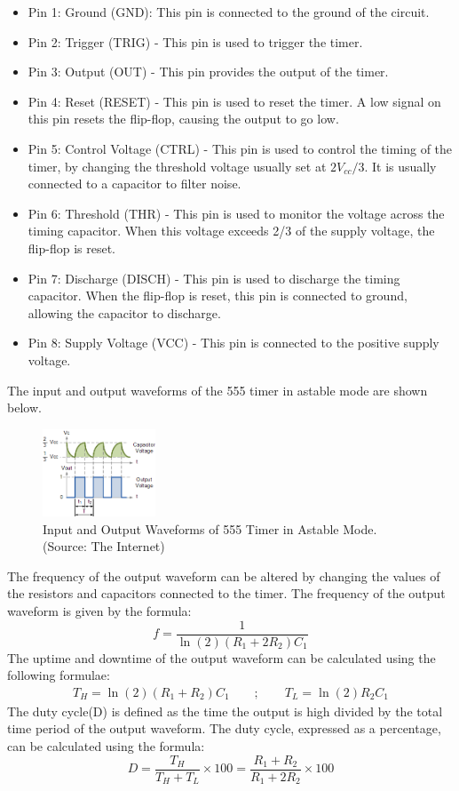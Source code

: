 \documentclass{scrartcl}
\newcommand{\1}{\mathbbm{1}}
\begin{document}
\begin{itemize}
    \item Pin 1: Ground (GND): This pin is connected to the ground of the circuit.
    \item Pin 2: Trigger (TRIG) - This pin is used to trigger the timer.
    \item Pin 3: Output (OUT) - This pin provides the output of the timer. 
    \item Pin 4: Reset (RESET) - This pin is used to reset the timer. A low signal on this pin resets the flip-flop, causing the output to go low.
    \item Pin 5: Control Voltage (CTRL) - This pin is used to control the timing of the timer, by changing the threshold voltage usually set at $2V_{cc}/3$. It is usually connected to a capacitor to filter noise.
    \item Pin 6: Threshold (THR) - This pin is used to monitor the voltage across the timing capacitor. When this voltage exceeds 2/3 of the supply voltage, the flip-flop is reset.
    \item Pin 7: Discharge (DISCH) - This pin is used to discharge the timing capacitor. When the flip-flop is reset, this pin is connected to ground, allowing the capacitor to discharge.
    \item Pin 8: Supply Voltage (VCC) - This pin is connected to the positive supply voltage.
\end{itemize} 

The input and output waveforms of the 555 timer in astable mode are shown below. 
\begin{figure}[H]
    \centering
    \includegraphics[width=0.3\textwidth]{waveforms.png}
    \caption{Input and Output Waveforms of 555 Timer in Astable Mode.  (Source: The Internet)}
    \label{fig:waveform}
\end{figure}

The frequency of the output waveform can be altered by changing the values of the resistors and capacitors connected to the timer.
The frequency of the output waveform is given by the formula:
\begin{equation}
    f = \frac{1}{\ln(2)(R_1 + 2R_2)C_1}
\end{equation}
The uptime and downtime of the output waveform can be calculated using the following formulae:
\begin{align}
    T_{H} = \ln(2)(R_1 + R_2)C_1\quad\quad;\quad\quad
    T_{L} = \ln(2)R_2C_1
\end{align}
The duty cycle(D) is defined as the time the output is high divided by the total time period of the output waveform.
The duty cycle, expressed as a percentage, can be calculated using the formula:
\begin{equation}
    D = \frac{T_{H}}{T_{H} + T_{L}} \times 100 = \frac{R_1 + R_2}{R_1 + 2R_2} \times 100 
\end{equation}
\end{document}
